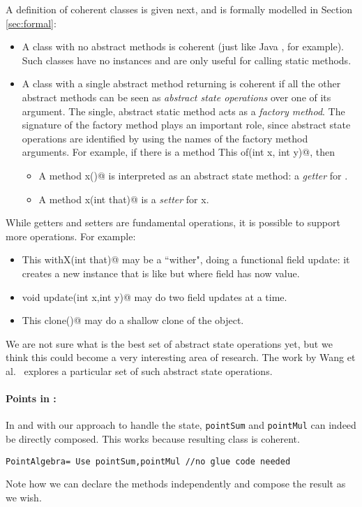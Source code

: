 A definition of coherent
classes is given next, and is formally modelled in Section \ref{sec:formal}:
\begin{itemize}
\item A class with no abstract methods is coherent (just like Java
  \Q@Math@, for example). Such classes have no instances and are only useful for calling static methods.
\item A class with a single abstract \Q@static@ method returning \Q@This@
is coherent if all the other abstract methods can be seen as \emph{abstract state
operations} over one of its argument. The single, abstract static
method acts as a \emph{factory method}.
The signature of the factory method plays an important role, since
abstract state operations are identified by using the names of the
factory method arguments.
For example,
if there is a \Q@static method This of(int x, int y)@,
then
\begin{itemize}
\item A method \Q@int x()@ is interpreted as an abstract state method: a \emph{getter} for \Q@x@.
\item A method \Q@void x(int that)@ is a \emph{setter} for x.
\end{itemize}
\end{itemize}
\noindent
While getters and setters are fundamental operations, it is possible to
support more operations. For example:
\begin{itemize}
\item \Q@method This withX(int that)@
may be a ``wither", doing a functional field update: it creates a new instance that is like \Q@this@ but where field \Q@x@ has now \Q@that@ value.
\item \Q@method void update(int x,int y)@
may do two field updates at a time.
\item\Q@method This clone()@ may do a shallow clone of the object.
\end{itemize}

We are not sure what is the best set of abstract state operations yet,
but we think this could become a very interesting area of research.
The work by Wang et al.~\cite{wang2016classless} explores a particular
set of such abstract state operations.

\paragraph{Points in \name:}
In \name and with our approach to handle the state, 
\lstinline{pointSum} and \lstinline{pointMul} can indeed be directly composed.
This works because resulting class is coherent.
\saveSpace\saveSpace
\begin{lstlisting}
PointAlgebra= Use pointSum,pointMul //no glue code needed
\end{lstlisting}  
\saveSpace\saveSpace
\noindent
  Note how we can declare the methods independently and compose the result
  as we wish. 

